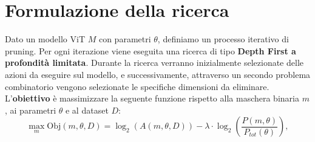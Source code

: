 \section{Formulazione della ricerca}
\label{section:search-form}
Dato un modello ViT $M$ con parametri $\theta$, definiamo un processo iterativo
di pruning. Per ogni iterazione viene eseguita una ricerca di tipo
\textbf{Depth First a profondità limitata}. Durante la ricerca verranno
inizialmente selezionate delle azioni da eseguire sul modello, e
successivamente, attraverso un secondo problema combinatorio vengono
selezionate le specifiche dimensioni da eliminare. L'\textbf{obiettivo} è
massimizzare la seguente funzione rispetto alla maschera binaria $m$, ai
parametri $\theta$ e al dataset $D$:
\begin{equation}
    \max_{m} \text{Obj}(m, \theta, D) = \log_2({A}(m, \theta, D)) - \lambda \cdot \log_2\left(\frac{{P}(m, \theta)}{{P}_{tot}(\theta)}\right),
\end{equation}

